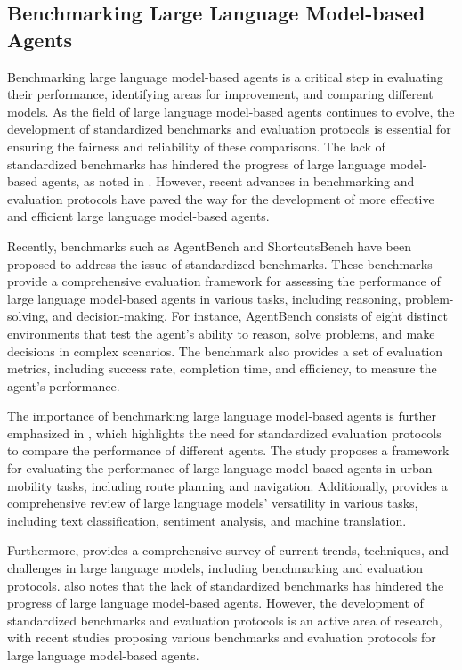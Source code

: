 \documentclass[11pt,a4paper]{article}
\begin{document}
\subsection{Benchmarking Large Language Model-based Agents}


Benchmarking large language model-based agents is a critical step in evaluating their performance, identifying areas for improvement, and comparing different models. As the field of large language model-based agents continues to evolve, the development of standardized benchmarks and evaluation protocols is essential for ensuring the fairness and reliability of these comparisons. The lack of standardized benchmarks has hindered the progress of large language model-based agents, as noted in \cite{arxiv:2309.14365}. However, recent advances in benchmarking and evaluation protocols have paved the way for the development of more effective and efficient large language model-based agents.

Recently, benchmarks such as AgentBench \cite{arxiv:2308.03688} and ShortcutsBench have been proposed to address the issue of standardized benchmarks. These benchmarks provide a comprehensive evaluation framework for assessing the performance of large language model-based agents in various tasks, including reasoning, problem-solving, and decision-making. For instance, AgentBench consists of eight distinct environments that test the agent's ability to reason, solve problems, and make decisions in complex scenarios. The benchmark also provides a set of evaluation metrics, including success rate, completion time, and efficiency, to measure the agent's performance.

The importance of benchmarking large language model-based agents is further emphasized in \cite{arxiv:2402.14744}, which highlights the need for standardized evaluation protocols to compare the performance of different agents. The study proposes a framework for evaluating the performance of large language model-based agents in urban mobility tasks, including route planning and navigation. Additionally, \cite{arxiv:2402.16142} provides a comprehensive review of large language models' versatility in various tasks, including text classification, sentiment analysis, and machine translation.

Furthermore, \cite{doi:10.3390/app14052074} provides a comprehensive survey of current trends, techniques, and challenges in large language models, including benchmarking and evaluation protocols. \cite{arxiv:2402.01680} also notes that the lack of standardized benchmarks has hindered the progress of large language model-based agents. However, the development of standardized benchmarks and evaluation protocols is an active area of research, with recent studies proposing various benchmarks and evaluation protocols for large language model-based agents.
\end{document}
